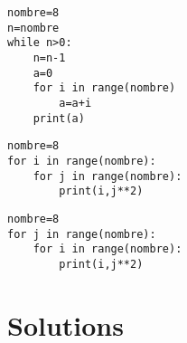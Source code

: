 \begin{lstlisting}[frame=lines, caption={boucles imbriquées},label=premcode15]
nombre=8
n=nombre
while n>0:
    n=n-1
    a=0
	for i in range(nombre)
	    a=a+i
	print(a)    
\end{lstlisting} 

\begin{lstlisting}[frame=lines,  caption={boucles imbriquées},label=premcode16]
nombre=8
for i in range(nombre):
	for j in range(nombre):
		print(i,j**2) 
\end{lstlisting} 

\begin{lstlisting}[frame=lines, caption={boucles imbriquées},label=premcode17]
nombre=8
for j in range(nombre):
	for i in range(nombre):
		print(i,j**2) 
\end{lstlisting} 

\section{Solutions}
\shipoutAnswer




